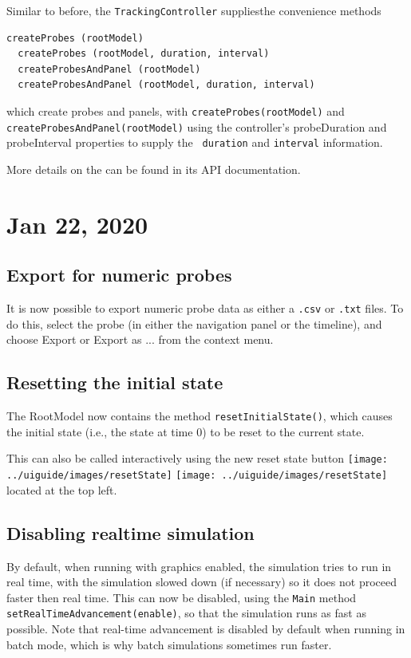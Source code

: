 \documentclass{article}
\begin{document}
Similar to before, the {\tt TrackingController} suppliesthe
convenience methods
%
\begin{lstlisting}[]
  createProbes (rootModel)
  createProbes (rootModel, duration, interval)
  createProbesAndPanel (rootModel)
  createProbesAndPanel (rootModel, duration, interval)
\end{lstlisting}
%
which create probes and panels, with {\tt createProbes(rootModel)} and
{\tt createProbesAndPanel(rootModel)} using the controller's {\sf
probeDuration} and {\sf probeInterval} properties to supply the {\tt
duration} and {\tt interval} information.

More details on the 
can be found in its API documentation.

\section*{Jan 22, 2020}

\subsection*{Export for numeric probes}

It is now possible to export numeric probe data as either a {\tt .csv}
or {\tt .txt} files. To do this, select the probe (in either the
navigation panel or the timeline), and choose {\sf Export} or {\sf
Export as ...} from the context menu.

\subsection*{Resetting the initial state}

The RootModel now contains the method {\tt resetInitialState()}, which
causes the initial state (i.e., the state at time 0) to be reset to
the current state.

This can also be called interactively using the new {\sf reset state}
button 
\iflatexml
\texttt{[image: ../uiguide/images/resetState]} 
\else
\texttt{[image: ../uiguide/images/resetState]} 
\fi
located at the top left.

\subsection*{Disabling realtime simulation}

By default, when running with graphics enabled, the simulation tries
to run in real time, with the simulation slowed down (if necessary) so
it does not proceed faster then real time. This can now be disabled,
using the {\tt Main} method {\tt setRealTimeAdvancement(enable)}, so
that the simulation runs as fast as possible. Note that real-time
advancement is disabled by default when running in batch mode, which
is why batch simulations sometimes run faster.
\end{document}
